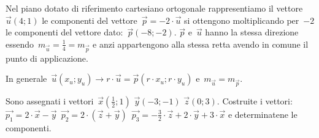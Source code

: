 \begin{comment}}
\mbox{}
\begin{minipage}{.49 \textwidth}
\end{minipage}
\hfill
\begin{minipage}{.49 \textwidth}
\end{minipage}
\end{comment}

\begin{esempio}
\mbox{}

\begin{minipage}{.49 \textwidth}
Nel piano dotato di riferimento cartesiano ortogonale rappresentiamo il 
vettore~$\vec{u}(4;1)$ le componenti
del vettore~$\vec{p}=-2\cdot \vec{u}$ si ottengono moltiplicando per~$-2$ 
le componenti del vettore dato:~$\vec{p}(-8;-2)$. $\vec{p}$ e~$\vec{u}$
hanno la stessa direzione essendo~$m_{\vec{u}}=\frac{1}{4}=m_{\vec{p}}$ e 
anzi appartengono alla stessa retta avendo in comune il punto di applicazione.
\end{minipage}
\hfill
\begin{minipage}{.49 \textwidth}
\begin{center}
 \scalebox{.8}{}
\end{center}
\end{minipage}
\end{esempio}

In generale~$\vec{u}(x_u;y_u) \rightarrow r \cdot \vec{u}=
             \vec{p}(r \cdot x_u; 
             r \cdot y_u)$ e~$m_{\vec{u}}=m_{\vec{p}}$.
   
%  

\begin{esempio}

Sono assegnati i vettori~$\vec{x}(\frac {1}{2};1)$ $\vec{y}(-3;-1)$ 
$\vec{z}(0;3)$.
Costruite i vettori:~$\vec{p_1}=2 \cdot \vec{x}-\vec{y}$\, $\vec{p_2}=2 \cdot 
(\vec{z}+\vec{y})$\, $\vec{p_3}=-\frac {3}{2} \cdot \vec{z} +2 \cdot \vec{y}+3 
\cdot \vec{x}$
e determinatene le componenti.
\end{esempio}

